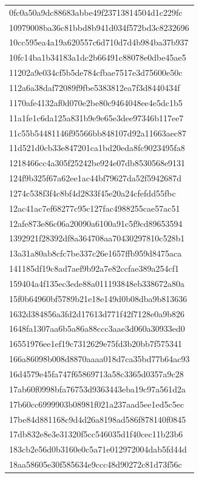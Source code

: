 \begin{tabular}{l}
0fc0a50a9dc88683abbe49f23713814504d1c229fc \\
10979008ba36c81bbd8b941d034f572bd3c8232696 \\
10cc595ea4a19a620557c6d710d7d4b984ba37b937 \\
10fc14ba1b34183a1dc2b66491c88078e0dbe45ae5 \\
11202a9e034cf5b5de784cfbae7517e3d75600e50c \\
112a6a38daf72089f9fbe5383812ea7f3d8440434f \\
1170afe4132af0d070e2be80c9464048ee4e5dc1b5 \\
11a1fe1c6da125a831b9e9e65e3dee97346b117ee7 \\
11c55b54481146f95566bb848107d92a11663aec87 \\
11d521d0cb33e847201ca1bd20eda8fc9023495fa8 \\
1218466cc4a305f25242be924e07db8530568e9131 \\
124f9b325f67a62ee1ac44bf79627da52f5942687d \\
1274c538f3f4c8bf4d2833f45e20a24cfefdd55fbc \\
12ac41ac7ef68277c95c127fac4988255cae57ac51 \\
12afe873e86c06a20090a6100a91c5f9cd89653594 \\
1392921f28392df8a364708aa70430297810c528b1 \\
13a31a80ab8cfc7be337c26e1657ffb959d8475aca \\
141185df19c8ad7aef9b92a7e82ccfae389a254cf1 \\
159404a4f135ec3ede88a011193848eb338672a80a \\
15f0b64960bf5789b21e18e149d0b08dba9b813636 \\
1632d384856a3fd2d17613d771f42f7128e0a9b826 \\
1648fa1307aa6b5a86a88ccc3aae3d060a30933ed0 \\
16551976ee1ef19c7312629e75fd3b20bb7f575341 \\
166a86098b008d8870aaaa018d7ca35bd77b64ac93 \\
16d4579e45fa747f65869713a58c3365d0357a9c28 \\
17ab60f0998bfa76753d9363443eba19c97a561d2a \\
17b60cc6999903b08981f021a237aad5ee1ed5c5ec \\
17be84d881168c9d4d26a8198ad586f878140f0845 \\
17db832e8e3e31320f5cc546035d1f40cec11b23b6 \\
183cb2e56d0b3160e0c5a71e012972004dab5fd44d \\
18aa58605e30f585634e9ccc48d90272c81d73f56c \\

\end{tabular}
